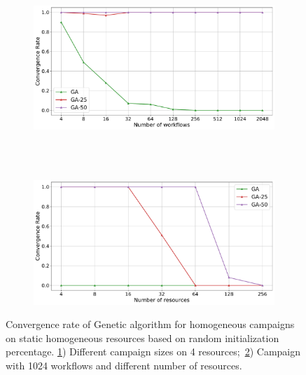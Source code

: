 
\begin{figure}[ht!]
    \centering
    \begin{subfigure}[b]{0.75\textwidth}
        \includegraphics[width=.95\textwidth]{figures/campaign/StHomoCampaigns_4StHomoResourcesGAconv.pdf}
        \caption{}
        \label{fig:ga_conv1}
    \end{subfigure}\\
    ~
    \begin{subfigure}[b]{0.75\textwidth}
        \includegraphics[width=.95\textwidth]{figures/campaign/HomogeResources_StHomogeCampaignsGAconv.pdf}
        \caption{}
        \label{fig:ga_conv2}
    \end{subfigure}
    \caption{Convergence rate of Genetic algorithm for homogeneous campaigns on
    static homogeneous resources based on random initialization
    percentage. \ref{fig:ga_conv1}) Different campaign sizes on 4
    resources;~\ref{fig:ga_conv2}) Campaign with 1024 workflows and different
    number of resources.}
    \label{fig:conv_rate}
\end{figure}

